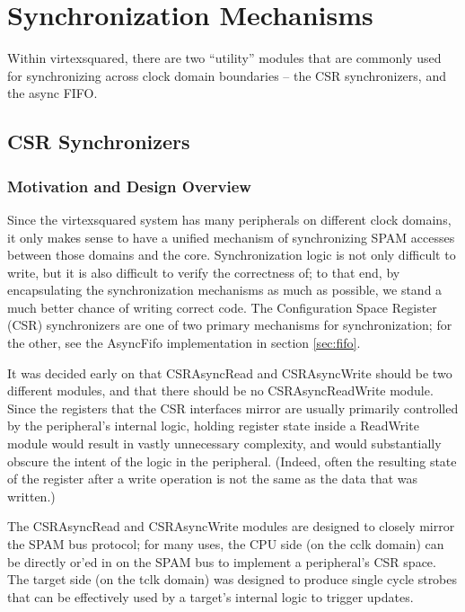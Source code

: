 \documentclass[10pt]{article}
\begin{document}
\section{Synchronization Mechanisms}

\label{sec:sync}

Within virtexsquared, there are two ``utility'' modules that are commonly
used for synchronizing across clock domain boundaries -- the CSR
synchronizers, and the async FIFO.

\subsection{CSR Synchronizers}

\label{sec:csrasync}

\subsubsection{Motivation and Design Overview}

Since the virtexsquared system has many peripherals on different clock
domains, it only makes sense to have a unified mechanism of synchronizing
SPAM accesses between those domains and the core. Synchronization logic is
not only difficult to write, but it is also difficult to verify the
correctness of; to that end, by encapsulating the synchronization mechanisms
as much as possible, we stand a much better chance of writing correct code.
The Configuration Space Register (CSR) synchronizers are one of two primary
mechanisms for synchronization; for the other, see the AsyncFifo
implementation in section \ref{sec:fifo}.

It was decided early on that CSRAsyncRead and CSRAsyncWrite should be two
different modules, and that there should be no CSRAsyncReadWrite module.
Since the registers that the CSR interfaces mirror are usually primarily
controlled by the peripheral's internal logic, holding register state inside
a ReadWrite module would result in vastly unnecessary complexity, and would
substantially obscure the intent of the logic in the peripheral. (Indeed,
often the resulting state of the register after a write operation is not the
same as the data that was written.)

The CSRAsyncRead and CSRAsyncWrite modules are designed to closely mirror
the SPAM bus protocol; for many uses, the CPU side (on the cclk domain) can
be directly or'ed in on the SPAM bus to implement a peripheral's CSR space.
The target side (on the tclk domain) was designed to produce single cycle
strobes that can be effectively used by a target's internal logic to trigger
updates.
\end{document}
